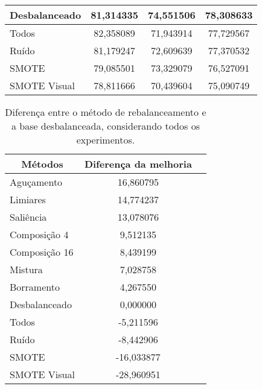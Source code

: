 \begin{table}[!htbp]
\begin{tabular}{|l|c|c|c|}
Desbalanceado                          & 81,314335                         & 74,551506                     & 78,308633      \\ \hline
Todos                                  & 82,358089                         & 71,943914                     & 77,729567      \\ \hline
Ruído                                  & 81,179247                         & 72,609639                     & 77,370532      \\ \hline
SMOTE                                  & 79,085501                         & 73,329079                     & 76,527091      \\ \hline
SMOTE Visual                           & 78,811666                         & 70,439604                     & 75,090749      \\ \hline
\end{tabular}
\end{table}

\begin{table}[!htbp]
\centering
\caption{Diferença entre o método de rebalanceamento e a base desbalanceada, considerando todos os experimentos.}
\label{tab:diffscore}
\begin{tabular}{|l|c|c|}
\hline
\multicolumn{1}{|c|}{\textbf{Métodos}} & \textbf{Diferença da melhoria} \\ \hline
Aguçamento                             & 16,860795                            \\ \hline
Limiares                               & 14,774237                            \\ \hline
Saliência                              & 13,078076                            \\ \hline
Composição 4                           & 9,512135                             \\ \hline
Composição 16                          & 8,439199                             \\ \hline
Mistura                                & 7,028758                             \\ \hline
Borramento                             & 4,267550                             \\ \hline
Desbalanceado                          & 0,000000                             \\ \hline
Todos                                  & -5,211596                            \\ \hline
Ruído                                  & -8,442906                            \\ \hline
SMOTE                                  & -16,033877                           \\ \hline
SMOTE Visual                           & -28,960951                           \\ \hline
\end{tabular}
\end{table}

